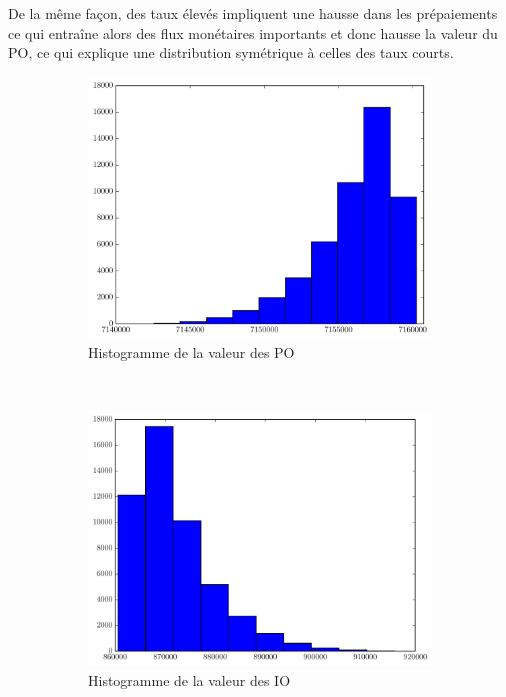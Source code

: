 De la même façon, des taux élevés impliquent une hausse dans les prépaiements ce qui
entraîne alors des flux monétaires importants et donc hausse la valeur du PO, ce qui
explique une distribution symétrique à celles des taux courts. 

\begin{figure}
  \centering
  \begin{subfigure}{0.3\paperwidth}
    \centering
    \caption{Histogramme de la valeur des PO}
    \includegraphics[width=0.3\paperwidth]{../fig/po_hist.pdf}
  \end{subfigure}
  ~
  \begin{subfigure}{0.3\paperwidth}
    \centering
    \caption{Histogramme de la valeur des IO}
    \includegraphics[width=0.3\paperwidth]{../fig/io_hist.pdf}
  \end{subfigure}
  \caption{}
  \label{histos}
\end{figure}

\begin{table}
  \centering
  \caption{}
  \label{iopo_table}

\end{table}



